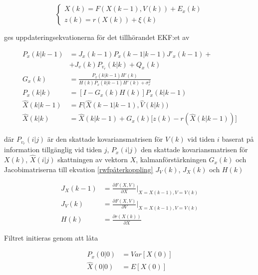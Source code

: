 \documentclass[11pt]{article}
\begin{document}
\begin{flushleft}
\begin{equation}
	\begin{cases}
	X(k) = F(X(k-1),V(k)) + E_x(k) \\
	z(k) = r(X(k)) + \xi(k)
	\end{cases}
\end{equation}

ges uppdateringsekvationerna för det tillhörandet EKF:et av

\begin{equation*}
	\begin{aligned}
	P_x(k|k-1) &= J_x(k-1) P_x(k-1|k-1)J'_x(k-1) + \\
	&+ J_v(k)P_{v_r}(k|k) + Q_x(k) \\
	G_x(k) &= \frac {P_x(k | k-1) H'(k)} {H(k)P_x(k|k-1)H'(k) + \sigma_r^2} \\
	P_x(k|k) &= [I - G_x(k)H(k)] P_x(k |  k - 1) \\
	\hat{X}(k|k-1) &= F \Big(\hat{X}(k-1 | k-1), \hat{V}(k | k) \Big) \\
	\hat{X}(k | k) &= \hat{X}(k | k - 1) + G_x(k) \Big[ z(k) - r(\hat{X}(k | k -1)) \Big] 
	\end{aligned}
\end{equation*}

där $P_{v_r}(i|j)$ är den skattade kovariansmatrisen för $V(k)$ vid tiden $i$ baserat på information tillgänglig vid tiden $j$, $P_x(i|j)$ den skattade kovariansmatrisen för $X(k)$, $\hat{X}(i|j)$ skattningen av vektorn $X$, kalmanförstärkningen $G_x(k)$ och Jacobimatriserna till ekvation \eqref{rwfpåterkoppling} $J_V(k)$, $J_X(k)$ och $H(k)$

\begin{equation*}
	\begin{aligned}
	J_X(k-1) &= \frac {\partial F(X,V)} {\partial X} \Big|_{X=X(k-1),V=V(k)} \\
	J_V(k) &=  \frac {\partial F(X,V)} {\partial V} \Big|_{X=X(k-1),V=V(k)} \\
	H(k) &=  \frac {\partial r (X(k))} {\partial X}
	\end{aligned}
\end{equation*}

Filtret initieras genom att låta 

\begin{equation*}
	\begin{aligned}
	P_x(0|0) &= Var [X(0)] \\
	\hat{X}(0|0) &= E[X(0)]
	\end{aligned}
\end{equation*}


\end{flushleft}
\end{document}
